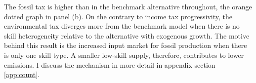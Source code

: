 The fossil tax is higher than in the benchmark alternative throughout, the orange dotted graph in panel (b).
On the contrary to income tax progressivity, the environmental tax diverges more from the benchmark model when there is no skill heterogeneity relative to the alternative with exogenous growth. The motive behind this result is the increased input market for fossil production when there is only one skill type. A smaller low-skill supply, therefore, contributes to lower emissions. I discuss the mechanism in more detail in appendix section \ref{app:count}.

 
 

